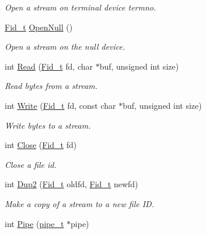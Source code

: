 \begin{DoxyCompactItemize}
\begin{DoxyCompactList}\small\item\em Open a stream on terminal device \textquotesingle{}termno\textquotesingle{}. \end{DoxyCompactList}\item 
\hyperlink{group__syscalls_ga5097222c5f0da97d92d4712359abc38f}{Fid\+\_\+t} \hyperlink{group__syscalls_ga39805b4ae668b715fb43f0f1e6ce8c45}{Open\+Null} ()
\begin{DoxyCompactList}\small\item\em Open a stream on the null device. \end{DoxyCompactList}\item 
int \hyperlink{group__syscalls_ga3e9dc545a789eb45b2d356eabbac3ee3}{Read} (\hyperlink{group__syscalls_ga5097222c5f0da97d92d4712359abc38f}{Fid\+\_\+t} fd, char $\ast$buf, unsigned int size)
\begin{DoxyCompactList}\small\item\em Read bytes from a stream. \end{DoxyCompactList}\item 
int \hyperlink{group__syscalls_gaf046f003fde24f79fb395c250137856c}{Write} (\hyperlink{group__syscalls_ga5097222c5f0da97d92d4712359abc38f}{Fid\+\_\+t} fd, const char $\ast$buf, unsigned int size)
\begin{DoxyCompactList}\small\item\em Write bytes to a stream. \end{DoxyCompactList}\item 
int \hyperlink{group__syscalls_ga82187e2e98af053a2ab6cb516e9e7f5a}{Close} (\hyperlink{group__syscalls_ga5097222c5f0da97d92d4712359abc38f}{Fid\+\_\+t} fd)
\begin{DoxyCompactList}\small\item\em Close a file id. \end{DoxyCompactList}\item 
int \hyperlink{group__syscalls_gacc048c60209e2dfb4b5cfc1c3f21aa88}{Dup2} (\hyperlink{group__syscalls_ga5097222c5f0da97d92d4712359abc38f}{Fid\+\_\+t} oldfd, \hyperlink{group__syscalls_ga5097222c5f0da97d92d4712359abc38f}{Fid\+\_\+t} newfd)
\begin{DoxyCompactList}\small\item\em Make a copy of a stream to a new file ID. \end{DoxyCompactList}\item 
int \hyperlink{group__syscalls_gab6355ce54e047c31538ed5ed9108b5b3}{Pipe} (\hyperlink{group__syscalls_gad56b5ceaaf7d3ab88b4be7f622314dfb}{pipe\+\_\+t} $\ast$pipe)

\end{DoxyCompactItemize}
